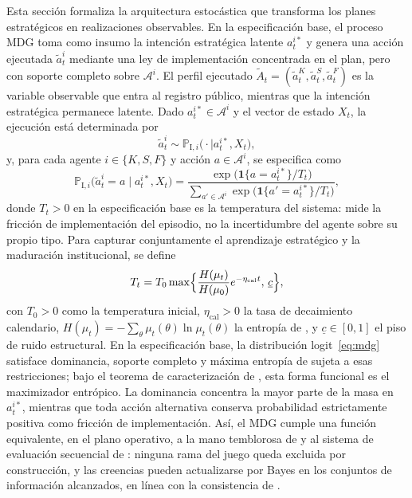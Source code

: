 \documentclass[review,authoryear,12pt]{elsarticle}
\theoremstyle{plain}
\theoremstyle{definition}
\newcommand{\1}{\mathbf{1}}
\newcommand{\ProbI}[1]{\mathbb{P}_{\mathrm{I},#1}}
\begin{document}
Esta sección formaliza la arquitectura estocástica que transforma los planes estratégicos en realizaciones observables. En la especificación base, el proceso MDG toma como insumo la intención estratégica latente $a_t^{i\ast}$ y genera una acción ejecutada $\tilde{a}_t^i$ mediante una ley de implementación concentrada en el plan, pero con soporte completo sobre $\mathcal{A}^i$. El perfil ejecutado $\tilde{A}_t=(\tilde{a}_t^K,\tilde{a}_t^S,\tilde{a}_t^F)$ es la variable observable que entra al registro público, mientras que la intención estratégica permanece latente. Dado $a_t^{i\ast}\in\mathcal{A}^i$ y el vector de estado $X_t$, la ejecución está determinada por
\[
\tilde{a}_t^i\sim\ProbI{i}\bigl(\cdot\mid a_t^{i\ast},X_t\bigr),
\]
y, para cada agente $i\in\{K,S,F\}$ y acción $a\in\mathcal{A}^i$, se especifica como
\begin{equation}
\ProbI{i}\bigl(\tilde{a}_t^i=a\mid a_t^{i\ast},X_t\bigr)
=\frac{\exp\bigl(\mathbf{1}\{a=a_t^{i\ast}\}/T_t\bigr)}{\sum_{a'\in\mathcal{A}^i}\exp\bigl(\mathbf{1}\{a'=a_t^{i\ast}\}/T_t\bigr)},
\label{eq:mdg}
\end{equation}
donde $T_t>0$ en la especificación base es la temperatura del sistema: mide la fricción de implementación del episodio, no la incertidumbre del agente sobre su propio tipo. Para capturar conjuntamente el aprendizaje estratégico y la maduración institucional, se define
\begin{equation}
T_t=T_0\max\Bigl\{\frac{H(\mu_t)}{H(\mu_0)}e^{-\eta_{\mathrm{cal}}t},\,\underline{c}\Bigr\},
\label{eq:temperature}
\end{equation}
con $T_0>0$ como la temperatura inicial, $\eta_{\mathrm{cal}}>0$ la tasa de decaimiento calendario, $H(\mu_t)=-\sum_\theta\mu_t(\theta)\ln\mu_t(\theta)$ la entropía de \citet{Shannon1948}, y $\underline{c}\in[0,1]$ el piso de ruido estructural. En la especificación base, la distribución logit~\eqref{eq:mdg} satisface dominancia, soporte completo y máxima entropía de \citet{Shannon1948} sujeta a esas restricciones; bajo el teorema de caracterización de \citet{Jaynes1957Information}, esta forma funcional es el maximizador entrópico. La dominancia concentra la mayor parte de la masa en $a_t^{i\ast}$, mientras que toda acción alternativa conserva probabilidad estrictamente positiva como fricción de implementación. Así, el MDG cumple una función equivalente, en el plano operativo, a la mano temblorosa de \citet{Selten1975Perfectness} y al sistema de evaluación secuencial de \citet{KrepsWilson1982}: ninguna rama del juego queda excluida por construcción, y las creencias pueden actualizarse por Bayes en los conjuntos de información alcanzados, en línea con la consistencia de \citet{FudenbergTirole1991PBE}.
\end{document}
